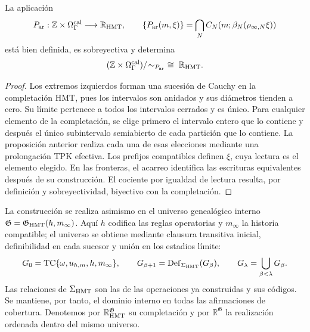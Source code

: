 \begin{proposition}
\label{hmtfg:cobertura-arquimediana}
La aplicación
\[
 P_{\rm ar}:\mathbb Z\times\Omega_\Gamma^{\rm cal}
       \longrightarrow\mathbb R_{\rm HMT},\qquad
 \{P_{\rm ar}(m,\xi)\}
    =\bigcap_N C_N(m;\beta_N(\rho_{\infty,N}\xi))
\]
está bien definida, es sobreyectiva y determina
\[
 (\mathbb Z\times\Omega_\Gamma^{\rm cal})/\!\sim_{P_{\rm ar}}
       \ \cong\ \mathbb R_{\rm HMT}.
\]
\end{proposition}
\begin{proof}
Los extremos izquierdos forman una sucesión de Cauchy en la completación
HMT, pues los intervalos son anidados y sus diámetros tienden a cero.
Su límite pertenece a todos los intervalos cerrados y es único.
Para cualquier elemento de la completación, se elige primero el intervalo
entero que lo contiene y después el único subintervalo semiabierto de
cada partición que lo contiene. La proposición anterior realiza cada
una de esas elecciones mediante una prolongación TPK efectiva.
Los prefijos compatibles definen \(\xi\), cuya lectura es el elemento
elegido. En las fronteras, el acarreo identifica las escrituras
equivalentes después de su construcción. El cociente por igualdad
de lectura resulta, por definición y sobreyectividad, biyectivo con
la completación.
\end{proof}

La construcción se realiza asimismo en el universo genealógico interno
\(\mathfrak G=\mathfrak G_{\rm HMT}(h,m_\infty)\). Aquí \(h\) codifica
las reglas operatorias y \(m_\infty\) la historia compatible; el universo
se obtiene mediante clausura transitiva inicial, definibilidad en cada
sucesor y unión en los estadios límite:
\[
 G_0=\operatorname{TC}\{\omega,u_{h,m},h,m_\infty\},\qquad
 G_{\beta+1}=\operatorname{Def}_{\Sigma_{\rm HMT}}(G_\beta),\qquad
 G_\lambda=\bigcup_{\beta<\lambda}G_\beta .
\]
Las relaciones de \(\Sigma_{\rm HMT}\) son las de las operaciones ya
construidas y sus códigos. Se mantiene, por tanto, el dominio interno
en todas las afirmaciones de cobertura. Denotemos por
\(\mathbb R_{\rm HMT}^{\mathfrak G}\) su completación y por
\(\mathbb R^{\mathfrak G}\) la realización ordenada dentro del mismo
universo.

